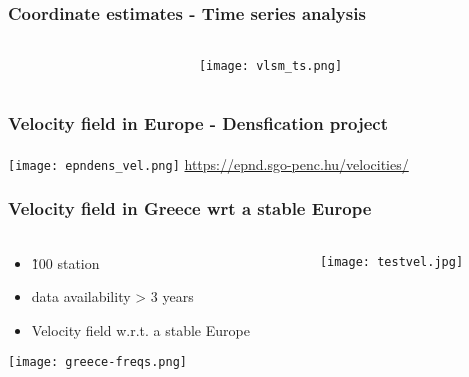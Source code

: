 \begin{frame}
  \frametitle{Coordinate estimates - Time series analysis}
  \framesubtitle{}
  \label{}
  \vskip-1cm
  \begin{columns}[T]
    \begin{column}{.3\textwidth}
 	   
    \end{column}
    \begin{column}{.7\textwidth}
      \begin{center}
        \texttt{[image: vlsm\_ts.png]}
      \end{center}
    \end{column}
  \end{columns}
 
\end{frame}
\note{}

\begin{frame}
  \frametitle{Velocity field in Europe - Densfication project}
  \framesubtitle{}
  \label{}
  \begin{center}
    \texttt{[image: epndens\_vel.png]}
    \url{https://epnd.sgo-penc.hu/velocities/}
  \end{center}
\end{frame}
\note{}


\begin{frame}
  \frametitle{Velocity field in Greece wrt a stable Europe}
  \framesubtitle{}
  \label{}
  \vskip-1cm
\begin{columns}[T]
  \begin{column}{.3\textwidth}
    \begin{center}
      \begin{itemize}\setlength\itemsep{1em}
        \item \~ 100 station
        \item data availability > 3 years
        \item Velocity field w.r.t. a stable Europe \citep{kreemer14}
      \end{itemize}
      \texttt{[image: greece-freqs.png]}
    \end{center}
  \end{column}
  \begin{column}{.7\textwidth}
    \texttt{[image: testvel.jpg]}
  \end{column}
\end{columns}
\end{frame}
\note{}

